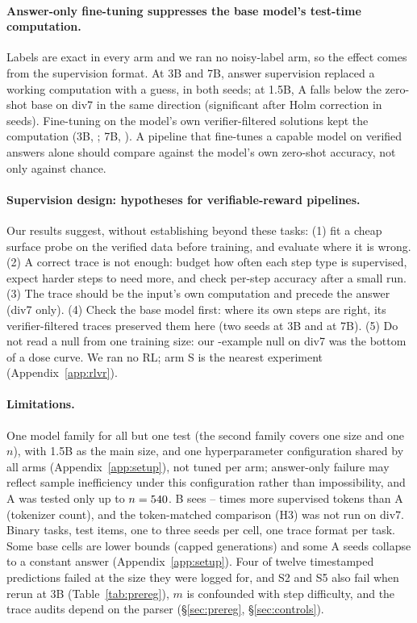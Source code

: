 \documentclass{article}
\theoremstyle{definition}
\begin{document}
\paragraph{Answer-only fine-tuning suppresses the base model's test-time computation.} Labels are exact in every arm and we ran no noisy-label arm, so the effect comes from the supervision format. At 3B and 7B, answer supervision replaced a working computation with a guess, in both seeds; at 1.5B, A falls below the zero-shot base on div7 in the same direction (significant after Holm correction in \divsevenABaseHolmSig{} seeds). Fine-tuning on the model's own verifier-filtered solutions kept the computation (3B, \threeBdivsevenSSeedTxt; 7B, \sevenBdivsevenSSeedTxt). A pipeline that fine-tunes a capable model on verified answers alone should compare against the model's own zero-shot accuracy, not only against chance.

\paragraph{Supervision design: hypotheses for verifiable-reward pipelines.} Our results suggest, without establishing beyond these tasks: (1) fit a cheap surface probe on the verified data before training, and evaluate where it is wrong. (2) A correct trace is not enough: budget how often each step type is supervised, expect harder steps to need more, and check per-step accuracy after a small run. (3) The trace should be the input's own computation and precede the answer (div7 only). (4) Check the base model first: where its own steps are right, its verifier-filtered traces preserved them here (two seeds at 3B and at 7B). (5) Do not read a null from one training size: our \nTrainSmall-example null on div7 was the bottom of a dose curve. We ran no RL; arm S is the nearest experiment (Appendix~\ref{app:rlvr}).

\paragraph{Limitations.} One model family for all but one test (the second family covers one size and one $n$), with 1.5B as the main size, and one hyperparameter configuration shared by all arms (Appendix~\ref{app:setup}), not tuned per arm; answer-only failure may reflect sample inefficiency under this configuration rather than impossibility, and A was tested only up to $n=540$. B sees \tokRatioLow--\tokRatioHigh{} times more supervised tokens than A (tokenizer count), and the token-matched comparison (H3) was not run on div7. Binary tasks, \nTest{} test items, one to three seeds per cell, one trace format per task. Some base cells are lower bounds (capped generations) and some A seeds collapse to a constant answer (Appendix~\ref{app:setup}). Four of twelve timestamped predictions failed at the size they were logged for, and S2 and S5 also fail when rerun at 3B (Table~\ref{tab:prereg}), $m$ is confounded with step difficulty, and the trace audits depend on the parser (\S\ref{sec:prereg}, \S\ref{sec:controls}).
\end{document}
